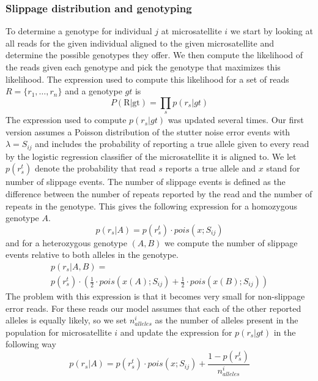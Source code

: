 \documentclass{bioinfo}
\begin{document}
\begin{methods}
\subsubsection{Slippage distribution and genotyping}
\label{subsubsec:modelSlipp}
To determine a genotype for individual $j$ at microsatellite $i$ we start by looking at all reads for the given individual aligned to the given microsatellite and determine the possible genotypes they offer. We then compute the likelihood of the reads given each genotype and pick the genotype that maximizes this likelihood. The expression used to compute this likelihood for a set of reads $R = \{r_1,\dots,r_n\}$ and a genotype $gt$ is 
\begin{equation}
P(\text{R|gt}) = \prod_s p(r_s|gt)
\end{equation}
The expression used to compute $p(r_s|gt)$ was updated several times. Our first version assumes a Poisson distribution of the stutter noise error events with $\lambda = S_{ij}$ and includes the probability of reporting a true allele given to every read by the logistic regression classifier of the microsatellite it is aligned to. We let $p(r^t_s)$ denote the probability that read $s$ reports a true allele and $x$ stand for number of slippage events. The number of slippage events is defined as the difference between the number of repeats reported by the read and the number of repeats in the genotype. This gives the following expression for a homozygous genotype $A$.
\begin{equation}
p(r_s|A) = p(r^t_s) \cdot pois(x;S_{ij})
\label{eq:likelihood}
\end{equation}
and for a heterozygous genotype $(A,B)$ we compute the number of slippage events relative to both alleles in the genotype.
\begin{multline}
p(r_s|A,B) = \\
p(r^t_s) \cdot 
(\frac{1}{2} \cdot pois(x(A);S_{ij})+ \frac{1}{2} \cdot pois(x(B);S_{ij}))
\end{multline}
The problem with this expression is that it becomes very small for non-slippage error reads. For these reads our model assumes that each of the other reported alleles is equally likely, so we set $n^i_{alleles}$ as the number of alleles present in the population for microsatellite $i$ and update the expression for $p(r_s|gt)$ in the following way
\begin{equation}
p(r_s|A) = p(r^t_s) \cdot pois(x;S_{ij}) + \frac{1-p(r^t_s)}{n^i_{alleles}}
\label{eq:likelihood2}
\end{equation}

\end{methods}
\end{document}

